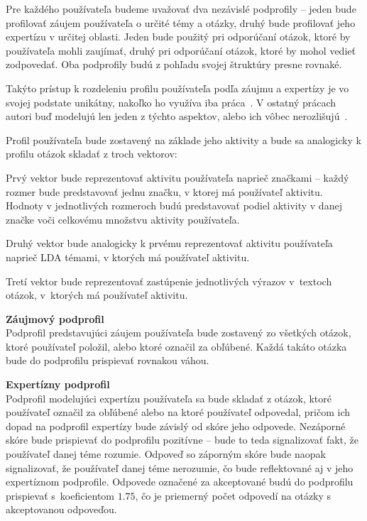 Pre každého používateľa budeme uvažovať dva nezávislé podprofily -- jeden bude profilovať záujem používateľa o určité témy a otázky,
druhý bude profilovať jeho expertízu v určitej oblasti. Jeden bude použitý
pri odporúčaní otázok, ktoré by používateľa mohli zaujímať, druhý pri odporúčaní otázok, ktoré by mohol vedieť zodpovedať.
Oba podprofily budú z pohľadu svojej štruktúry presne rovnaké.

Takýto prístup k rozdeleniu profilu používateľa podľa záujmu a expertízy je vo svojej podstate unikátny, nakoľko ho využíva
iba práca~\cite{Xu2012}. V ostatný prácach autori buď modelujú len jeden z týchto aspektov, alebo ich vôbec nerozlišujú~\cite{Srba2016}.

Profil používateľa bude zostavený na základe jeho aktivity a bude sa analogicky k profilu otázok skladať z troch vektorov:

\begin{my_enumerate}
\item{
  Prvý vektor bude reprezentovať aktivitu používateľa naprieč značkami -- každý rozmer bude predstavovať jednu značku,
  v ktorej má používateľ aktivitu. Hodnoty v jednotlivých rozmeroch budú predstavovať podiel aktivity v danej značke voči
  celkovému množstvu aktivity používateľa.
}
\item{
  Druhý vektor bude analogicky k prvému reprezentovať aktivitu používateľa naprieč LDA témami, v ktorých má používateľ aktivitu.
}
\item{
  Tretí vektor bude reprezentovať zastúpenie jednotlivých výrazov v~textoch otázok, v~ktorých má používateľ aktivitu.
}
\end{my_enumerate}

\textbf{Záujmový podprofil}\\
Podprofil predstavujúci záujem používateľa bude zostavený zo všetkých otázok, ktoré používateľ položil, alebo ktoré označil
za obľúbené. Každá takáto otázka bude do podprofilu prispievať rovnakou váhou.

\textbf{Expertízny podprofil}\\
Podprofil modelujúci expertízu používateľa sa bude skladať z otázok, ktoré používateľ označil za obľúbené alebo
na ktoré používateľ odpovedal, pričom ich dopad na podprofil expertízy bude závislý od skóre jeho odpovede.
Nezáporné skóre bude prispievať do podprofilu pozitívne -- bude to teda signalizovať
fakt, že používateľ danej téme rozumie. Odpoveď so záporným skóre bude naopak signalizovať, že používateľ danej téme nerozumie,
čo bude reflektované aj v jeho expertíznom podprofile. Odpovede označené za akceptované budú do podprofilu prispievať
s~koeficientom $1.75$, čo je priemerný počet odpovedí na otázky s akceptovanou odpoveďou.

